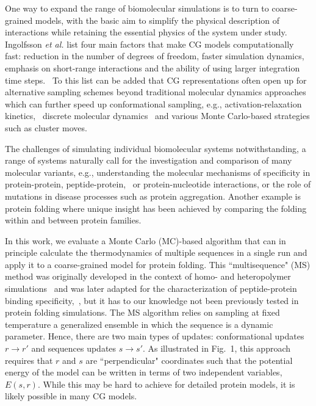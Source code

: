 \documentclass[
aip,
rsi,%
amsmath,amssymb,
reprint,%
]{revtex4-1}
\newcommand	 {\sbar}	{{s}}
\newcommand	 {\rbar}	{{r}}
\begin{document}
One way to expand the range of biomolecular simulations is to turn to coarse-grained models, with the basic aim to simplify the physical description of interactions while retaining the essential physics of the system under study.~\cite{Riniker2012} Ingolfsson \textit{et al.} list four main factors that make CG models computationally fast: reduction in the number of degrees of freedom, faster simulation dynamics, emphasis on short-range interactions and the ability of using larger integration time steps.~\cite{Ingolfsson2014} To this list can be added that CG representations often open up for alternative sampling schemes beyond traditional molecular dynamics approaches which can further speed up conformational sampling, e.g., activation-relaxation kinetics,~\cite{Beland2011} discrete molecular dynamics~\cite{Proctor2011} and various Monte Carlo-based strategies such as cluster moves.~\cite{Vitalis2009} 

The challenges of simulating individual biomolecular systems notwithstanding, a range of systems naturally call for the investigation and comparison of many molecular variants, e.g., understanding the molecular mechanisms of specificity in protein-protein, peptide-protein,~\cite{Zarrinpar2003} or protein-nucleotide interactions, or the role of mutations in disease processes such as protein aggregation. Another example is protein folding where unique insight has been achieved by comparing the folding within and between protein families.~\cite{Tzul2017,Wensley2010}

In this work, we evaluate a Monte Carlo (MC)-based algorithm that can in principle calculate the thermodynamics of multiple sequences in a single run and apply it to a coarse-grained model for protein folding. This ``multisequence" (MS) method was originally developed in the context of homo- and heteropolymer simulations~\cite{Irback1995} and was later adapted for the characterization of peptide-protein binding specificity,~\cite{Bhattacherjee2013,Wallin2017}, but it has to our knowledge not been previously tested in protein folding simulations. The MS algorithm relies on sampling at fixed temperature a generalized ensemble in which the sequence is a dynamic parameter. Hence, there are two main types of updates: conformational updates $\rbar\rightarrow\rbar'$ and sequences updates $\sbar\rightarrow\sbar'$. As illustrated in Fig.~1, this approach requires that $\rbar$ and $\sbar$ are ``perpendicular" coordinates such that the potential energy of the model can be written in terms of two independent variables, $E(\sbar,\rbar)$. While this may be hard to achieve for detailed protein models, it is likely possible in many CG models.
\end{document}
